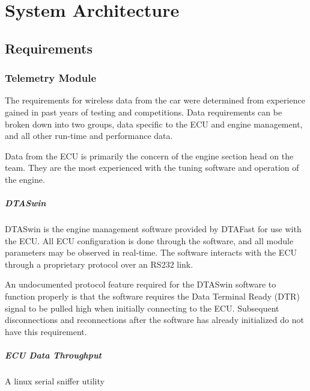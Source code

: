 %
%
%
%

\chapter{System Architecture}
\label{chap:architecture}

\section{Requirements}

\subsection{Telemetry Module}

The requirements for wireless data from the car were determined from experience gained in past years of testing and competitions. Data requirements can be broken down into two groups, data specific to the ECU and engine management, and all other run-time and performance data.

Data from the ECU is primarily the concern of the engine section head on the team. They are the most experienced with the tuning software and operation of the engine.

\paragraph*{DTASwin}

DTASwin is the engine management software provided by DTAFast for use with the ECU. All ECU configuration is done through the software, and all module parameters may be observed in real-time. The software interacts with the ECU through a proprietary protocol over an RS232 link.

An undocumented protocol feature required for the DTASwin software to function properly is that the software requires the Data Terminal Ready (DTR) signal to be pulled high when initially connecting to the ECU. Subsequent disconnections and reconnections after the software has already initialized do not have this requirement.


\paragraph*{ECU Data Throughput}

A linux serial sniffer utility



